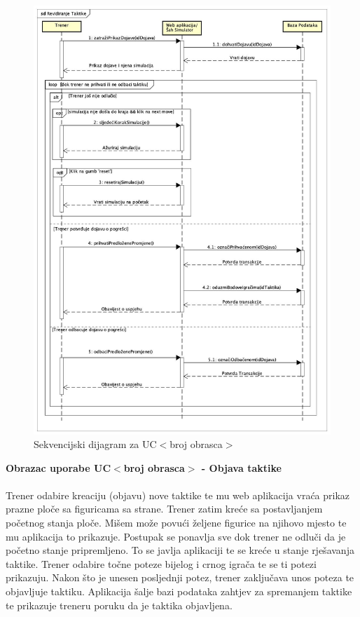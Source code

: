 				
				\begin{figure}[H]
					\centerfloat
        					\includegraphics[scale=0.40]{dijagrami/RevidiranjeTaktike.jpg} %
        					\caption{Sekvencijski dijagram za UC$<$broj obrasca$>$}
        					\label{fig:UC$<$broj obrasca$>$}
				\end{figure}
				
				\eject
	
				\textbf{Obrazac uporabe UC$<$broj obrasca$>$ - Objava taktike}\\
				\\Trener odabire kreaciju (objavu) nove taktike te mu web aplikacija vraća prikaz prazne ploče sa figuricama sa strane. Trener zatim kreće sa postavljanjem početnog stanja ploče. Mišem može povući željene figurice na njihovo mjesto te mu aplikacija to prikazuje. Postupak se ponavlja sve dok trener ne odluči da je početno stanje pripremljeno. To se javlja aplikaciji te se kreće u stanje rješavanja taktike. Trener odabire točne poteze bijelog i crnog igrača te se ti potezi prikazuju. Nakon što je unesen posljednji potez, trener zaključava unos poteza te objavljuje taktiku. Aplikacija šalje bazi podataka zahtjev za spremanjem taktike te prikazuje treneru poruku da je taktika objavljena.
			


